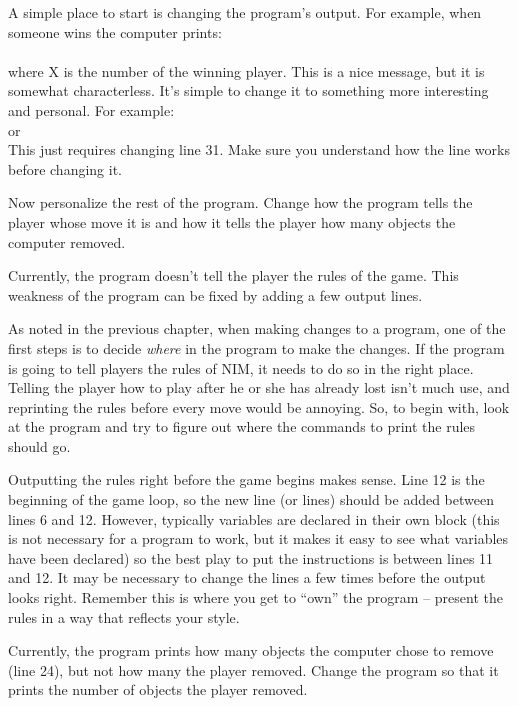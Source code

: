 A simple place to start is changing the program's output.  For example, when someone wins the computer prints:\\
 \\
where X is the number of the winning player.
This is a nice message, but it is somewhat characterless.  It's simple to change it to something more interesting and personal.  For example:\\
 or \\
 This just requires changing line 31.  Make sure you understand how the line works before changing it.

Now personalize the rest of the program.  Change how the program tells the player whose move it is and how it tells the player how many objects the computer removed.


Currently, the program doesn't tell the player the rules of the game.  This weakness of the program can be fixed by adding a few output lines. 

As noted in the previous chapter, when making changes to a program, one of the first steps is to decide \emph{where} in the program to make the changes.
If the program is going to tell players the rules of NIM, it needs to do so in the right place.  Telling the player how to play after he or she has already lost isn't much use, and reprinting the rules before every move would be annoying.  So, to begin with, look at the program and try to figure out where the commands to print the rules should go.

Outputting the rules right before the game begins makes sense.  Line 12 is the beginning of the game loop, so the new line (or lines) should be added between lines 6 and 12.   However, typically variables are declared in their own block (this is not necessary for a program to work, but it makes it easy to see what variables have been declared) so the best play to put the instructions is between lines 11 and 12.   It may be necessary to change the lines a few times before the output looks right.  Remember this is where you get to ``own'' the program -- present the rules in a way that reflects your style.

Currently, the program prints how many objects the computer chose to remove (line 24), but not how many the player removed.  Change the program so that it prints the number of objects the player removed.  

